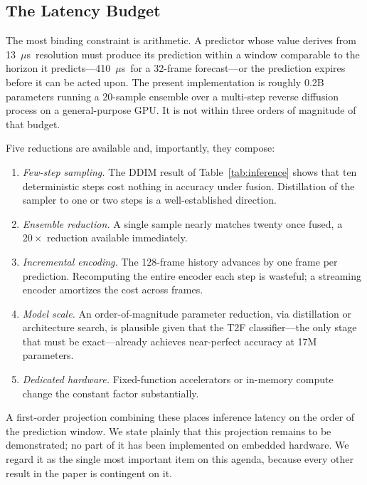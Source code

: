 \documentclass[lettersize,journal]{IEEEtran}
\newcommand{\us}{\ensuremath{\mu}s}
\begin{document}
\subsection{\textbf{The Latency Budget}}
The most binding constraint is arithmetic. A predictor whose value
derives from 13~\us\ resolution must produce its prediction within a
window comparable to the horizon it predicts---410~\us\ for a 32-frame
forecast---or the prediction expires before it can be acted upon. The
present implementation is roughly 0.2B parameters running a 20-sample
ensemble over a multi-step reverse diffusion process on a
general-purpose GPU. It is not within three orders of magnitude of that
budget.

Five reductions are available and, importantly, they compose:

\begin{enumerate}
\item \emph{Few-step sampling.} The DDIM result of
Table~\ref{tab:inference} shows that ten deterministic steps cost
nothing in accuracy under fusion. Distillation of the sampler to one or
two steps is a well-established direction.
\item \emph{Ensemble reduction.} A single sample nearly matches twenty
once fused, a $20\times$ reduction available immediately.
\item \emph{Incremental encoding.} The 128-frame history advances by one
frame per prediction. Recomputing the entire encoder each step is
wasteful; a streaming encoder amortizes the cost across frames.
\item \emph{Model scale.} An order-of-magnitude parameter reduction, via
distillation \cite{Hinton2015,Cheng2023} or architecture search, is
plausible given that the T2F classifier---the only stage that must be
exact---already achieves near-perfect accuracy at 17M parameters.
\item \emph{Dedicated hardware.} Fixed-function accelerators or
in-memory compute change the constant factor substantially.
\end{enumerate}

A first-order projection combining these places inference latency on the
order of the prediction window. We state plainly that this projection
remains to be demonstrated; no part of it has been implemented on
embedded hardware. We regard it as the single most important item on
this agenda, because every other result in the paper is contingent on
it.
\end{document}
